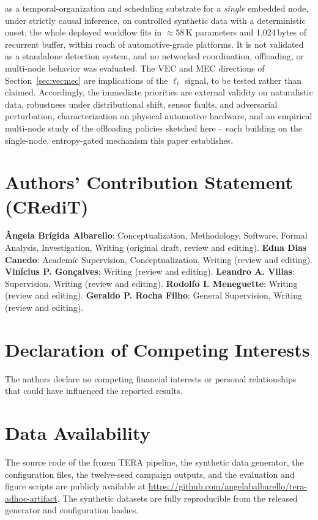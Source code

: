 \documentclass[a4paper,fleqn]{cas-dc}
\begin{document}
as a temporal-organization and scheduling substrate for a \emph{single} embedded
node, under strictly causal inference, on controlled synthetic data with a
deterministic onset; the whole deployed workflow fits in $\approx$58\,K parameters
and 1{,}024\,bytes of recurrent buffer, within reach of automotive-grade platforms.
It is not validated as a standalone detection system, and no networked coordination,
offloading, or multi-node behavior was evaluated. The VEC and MEC directions of
Section~\ref{sec:vecmec} are implications of the $\ell_t$ signal, to be tested rather
than claimed. Accordingly, the immediate priorities are external validity on
naturalistic data, robustness under distributional shift, sensor faults, and
adversarial perturbation, characterization on physical automotive hardware, and an
empirical multi-node study of the offloading policies sketched here -- each building
on the single-node, entropy-gated mechanism this paper establishes.
\section*{Authors' Contribution Statement (CRediT)}
\textbf{{\^A}ngela Br\'igida Albarello}: Conceptualization, Methodology,
Software, Formal Analysis, Investigation, Writing (original draft, review
and editing).
\textbf{Edna Dias Canedo}: Academic Supervision, Conceptualization,
Writing (review and editing).
\textbf{Vin\'icius P. Gon\c{c}alves}: Writing (review and editing).
\textbf{Leandro A. Villas}: Supervision, Writing (review and editing).
\textbf{Rodolfo I. Meneguette}: Writing (review and editing).
\textbf{Geraldo P. Rocha Filho}: General Supervision, Writing (review
and editing).
\section*{Declaration of Competing Interests}
The authors declare no competing financial interests or personal
relationships that could have influenced the reported results.
\section*{Data Availability}
{\color{\revcolor}The source code of the frozen TERA pipeline, the synthetic data generator, the
configuration files, the twelve-seed campaign outputs, and the evaluation and
figure scripts are publicly available at
\url{https://github.com/angelabalbarello/tera-adhoc-artifact}. The synthetic
datasets are fully reproducible from the released generator and configuration
hashes.}
\end{document}
